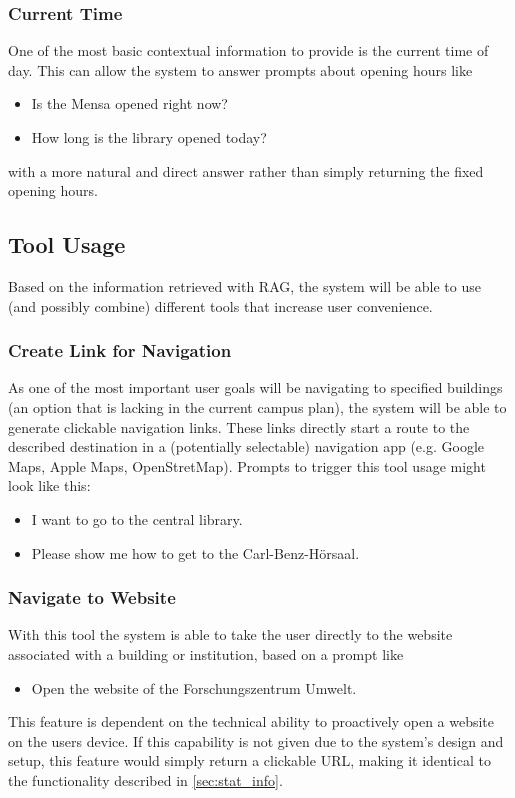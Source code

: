 \documentclass{article}
\begin{document}
\subsubsection{Current Time}
One of the most basic contextual information to provide is the current time of day. This can allow the system to answer prompts about opening hours like
\begin{itemize}
    \item Is the Mensa opened right now?
    \item How long is the library opened today?
\end{itemize}
with a more natural and direct answer rather than simply returning the fixed opening hours.

\subsection{Tool Usage}
Based on the information retrieved with RAG, the system will be able to use (and possibly combine) different tools that increase user convenience.

\subsubsection{Create Link for Navigation} \label{sec:create_nav_link}
As one of the most important user goals will be navigating to specified buildings (an option that is lacking in the current campus plan), the system will be able to generate clickable navigation links. These links directly start a route to the described destination in a (potentially selectable) navigation app (e.g. Google Maps, Apple Maps, OpenStretMap). Prompts to trigger this tool usage might look like this:
  \begin{itemize}
    \item I want to go to the central library.
    \item Please show me how to get to the Carl-Benz-Hörsaal.
  \end{itemize}

\subsubsection{Navigate to Website}
With this tool the system is able to take the user directly to the website associated with a building or institution, based on a prompt like
  \begin{itemize}
    \item Open the website of the Forschungszentrum Umwelt.
  \end{itemize}
This feature is dependent on the technical ability to proactively open a website on the users device. If this capability is not given due to the system's design and setup, this feature would simply return a clickable URL, making it identical to the functionality described in \ref{sec:stat_info}.
\end{document}
